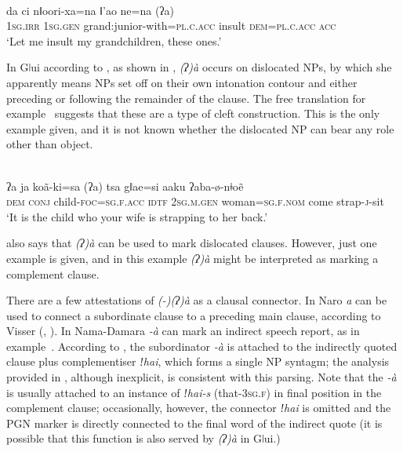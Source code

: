 \documentclass[output=paper]{LSP/langsci}
\begin{document}
\ea {}\\\label{09-mc-ex:16} 
\gll da ci nǁoori-xa=na ǁ’ao n{\textbar}e=na (ʔa)\\
1\textsc{sg}.\textsc{irr} 1\textsc{sg.gen} grand:junior-with=\textsc{pl}.\textsc{c}.\textsc{acc} insult \textsc{dem}=\textsc{pl}.\textsc{c}.\textsc{acc} \textsc{acc}\\
\glt ‘Let me insult my grandchildren, these ones.’
\z

In Gǀui according to \citet{Ono2011Gui}, as shown in , \textit{(ʔ)à} occurs on dislocated NPs, by which she apparently means NPs set off on their own intonation contour and either preceding or following the remainder of the clause. The free translation for example~ suggests that these are a type of cleft construction. This is the only example given, and it is not known whether the dislocated NP can bear any role other than object.

\ea {}\\\label{09-mc-ex:17} 
\gll ʔa ja k{\textbar}oã-ki=sa (ʔa) tsa gǁae=si aaku ʔaba-ø-nǂoẽ\\
\textsc{dem} \textsc{conj} child-\textsc{foc}=\textsc{sg}.\textsc{f}.\textsc{acc} \textsc{idtf} 2\textsc{sg}.\textsc{m}.\textsc{gen} woman=\textsc{sg}.\textsc{f}.\textsc{nom} come strap-\textsc{j}-sit\\
\glt ‘It is the child who your wife is strapping to her back.’
\z

\citet[2]{Ono2011Gui} also says that \textit{(ʔ)à} can be used to mark dislocated clauses. However, just one example is given, and in this example \textit{(ʔ)à} might be interpreted as marking a complement clause.


There are a few attestations of \textit{(-)(ʔ)à} as a clausal connector. In Naro \textit{a} can be used to connect a subordinate clause to a preceding main clause, according to Visser (\citeyear[1]{Visser2001Naro}, \citeyear[180]{Visser2010Verbal}). In Nama-Damara \textit{-à} can mark an indirect speech report, as in example~. According to \citet[256]{Hagman1973Nama}, the subordinator \textit{-à} is attached to the indirectly quoted clause plus complementiser\textit{ ǃhai}, which forms a single NP syntagm; the analysis provided in \citet[345]{Haacke2013Gora}, although inexplicit, is consistent with this parsing. Note that the \textit{-à} is usually attached to an instance of \textit{ǃhai-s} (that-3\textsc{sg.f}) in final position in the complement clause; occasionally, however, the connector \textit{ǃhai} is omitted and the PGN marker is directly connected to the final word of the indirect quote (it is possible that this function is also served by \textit{(ʔ)à} in Gǀui.)
\end{document}
